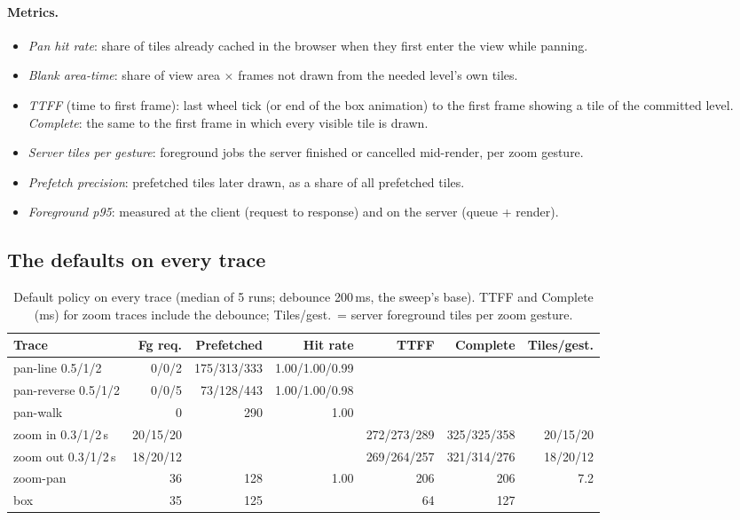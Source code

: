 \documentclass[11pt,a4paper]{article}
\begin{document}
\paragraph{Metrics.}
\begin{itemize}
  \item \emph{Pan hit rate}: share of tiles already cached in the browser when they first enter the view while
  panning.
  \item \emph{Blank area-time}: share of view area $\times$ frames not drawn from the needed level's own tiles.
  \item \emph{TTFF} (time to first frame): last wheel tick (or end of the box animation) to the first frame showing a
  tile of the committed level. \emph{Complete}: the same to the first frame in which every visible tile is drawn.
  \item \emph{Server tiles per gesture}: foreground jobs the server finished or cancelled mid-render, per zoom
  gesture.
  \item \emph{Prefetch precision}: prefetched tiles later drawn, as a share of all prefetched tiles.
  \item \emph{Foreground p95}: measured at the client (request to response) and on the server (queue + render).
\end{itemize}

\subsection{The defaults on every trace}
\begin{table}[!htbp]
\centering\small
\caption{Default policy on every trace (median of 5 runs; debounce 200\,ms, the sweep's base). TTFF and Complete (ms)
for zoom traces include the debounce; Tiles/gest.\ = server foreground tiles per zoom gesture.}
\label{tab:base}
\footnotesize\setlength{\tabcolsep}{2pt}
\begin{tabular*}{\linewidth}{@{\extracolsep{\fill}}lrrrrrr}
\toprule
Trace & Fg req. & Prefetched & Hit rate & TTFF & Complete & Tiles/gest. \\
\midrule
pan-line 0.5/1/2 & 0/0/2 & 175/313/333 & 1.00/1.00/0.99 & & & \\
pan-reverse 0.5/1/2 & 0/0/5 & 73/128/443 & 1.00/1.00/0.98 & & & \\
pan-walk & 0 & 290 & 1.00 & & & \\
zoom in 0.3/1/2\,s & 20/15/20 & & & 272/273/289 & 325/325/358 & 20/15/20 \\
zoom out 0.3/1/2\,s & 18/20/12 & & & 269/264/257 & 321/314/276 & 18/20/12 \\
zoom-pan & 36 & 128 & 1.00 & 206 & 206 & 7.2 \\
box & 35 & 125 & & 64 & 127 & \\
\bottomrule
\end{tabular*}
\end{table}
\end{document}
